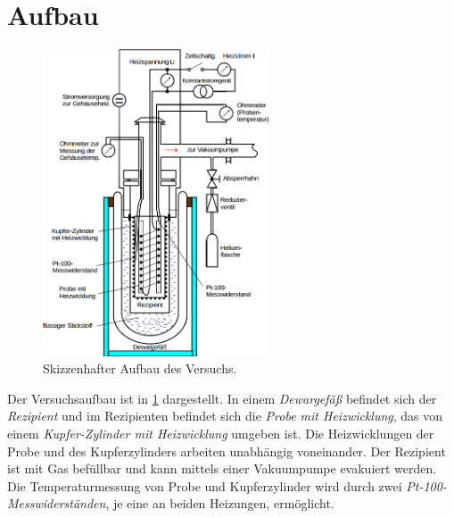 \section{Aufbau}
\begin{figure}
	\centering
	\includegraphics[width=0.6\textwidth,]{graphics/aufbau.png}
	\caption{Skizzenhafter Aufbau des Versuchs. \cite{skript}}
	\label{fig:aufbau}
\end{figure}
Der Versuchsaufbau ist in \ref{fig:aufbau} dargestellt.
In einem \emph{Dewargefäß} befindet sich der \emph{Rezipient} und im Rezipienten befindet sich die \emph{Probe mit Heizwicklung}, das von einem \emph{Kupfer-Zylinder mit Heizwicklung} umgeben ist.
Die Heizwicklungen der Probe und des Kupferzylinders arbeiten unabhängig voneinander.
Der Rezipient ist mit Gas befüllbar und kann mittels einer Vakuumpumpe evakuiert werden. 
Die Temperaturmessung von Probe und Kupferzylinder wird durch zwei \emph{Pt-100-Messwiderständen}, je eine an beiden Heizungen, ermöglicht.


